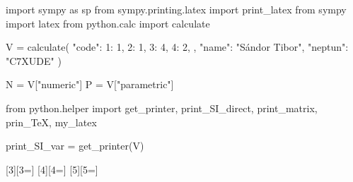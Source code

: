 \usepackage{pyluatex}

\begin{python}
import sympy as sp
from sympy.printing.latex import print_latex
from sympy import latex
from python.calc import calculate

V = calculate({
    "code": {
        1: 1,
        2: 1,
        3: 4,
        4: 2,
    },
    "name": "Sándor Tibor",
    "neptun": "C7XUDE"
})

N = V["numeric"]
P = V["parametric"]

from python.helper import get_printer, print_SI_direct, print_matrix, prin_TeX, my_latex

print_SI_var = get_printer(V)
\end{python}

\usepackage{xargs}

\newcommand{\pv}[1]{\py{V["#1"]}}
\newcommand{\pvec}[2]{\py{V["#1"][#2]}}
\newcommand{\pmat}[3]{\py{V["#1"][#2, #3]}}

[3][3=]{}
[4][4=]{}
[5][5=]{}
